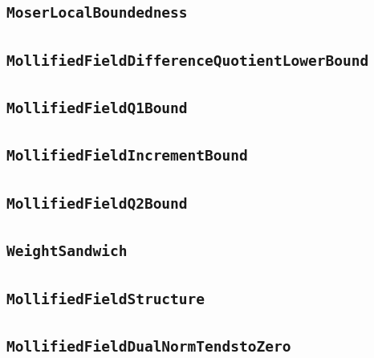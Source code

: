 \documentclass[11pt]{amsart}
\theoremstyle{definition}
\begin{document}
\subsection{\texorpdfstring{\texttt{MoserLocalBoundedness}}{MoserLocalBoundedness}}\label{node:MoserLocalBoundedness}


\subsection{\texorpdfstring{\texttt{MollifiedFieldDifferenceQuotientLowerBound}}{MollifiedFieldDifferenceQuotientLowerBound}}\label{node:MollifiedFieldDifferenceQuotientLowerBound}


\subsection{\texorpdfstring{\texttt{MollifiedFieldQ1Bound}}{MollifiedFieldQ1Bound}}\label{node:MollifiedFieldQ1Bound}


\subsection{\texorpdfstring{\texttt{MollifiedFieldIncrementBound}}{MollifiedFieldIncrementBound}}\label{node:MollifiedFieldIncrementBound}


\subsection{\texorpdfstring{\texttt{MollifiedFieldQ2Bound}}{MollifiedFieldQ2Bound}}\label{node:MollifiedFieldQ2Bound}


\subsection{\texorpdfstring{\texttt{WeightSandwich}}{WeightSandwich}}\label{node:WeightSandwich}


\subsection{\texorpdfstring{\texttt{MollifiedFieldStructure}}{MollifiedFieldStructure}}\label{node:MollifiedFieldStructure}


\subsection{\texorpdfstring{\texttt{MollifiedFieldDualNormTendstoZero}}{MollifiedFieldDualNormTendstoZero}}\label{node:MollifiedFieldDualNormTendstoZero}

\end{document}
